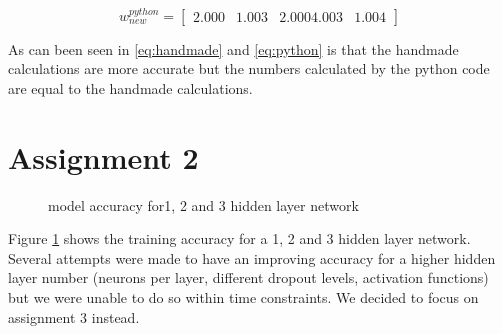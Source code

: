 \documentclass[a4paper,12pt]{article}
\begin{document}
\begin{equation}
w_{new}^{python}=
\begin{bmatrix} 2.000 &   1.003 & 2.000    4.003 & 1.004
\end{bmatrix}
\label{eq:python}
\end{equation}

As can been seen in \ref{eq:handmade} and \ref{eq:python} is that the handmade calculations are more accurate but the numbers calculated by the python code are equal to the handmade calculations. 


\section{Assignment 2}

\begin{figure}[H]
\hfill
{}
\hfill
\caption{model accuracy for1, 2 and 3 hidden layer network}
\label{model1}
\end{figure}

Figure \ref{model1} shows the training accuracy for a 1, 2 and 3 hidden layer network. Several attempts were made to have an improving accuracy for a higher hidden layer number (neurons per layer, different dropout levels, activation functions) but we were unable to do so within time constraints. We decided to focus on assignment 3 instead.

%
\end{document}
